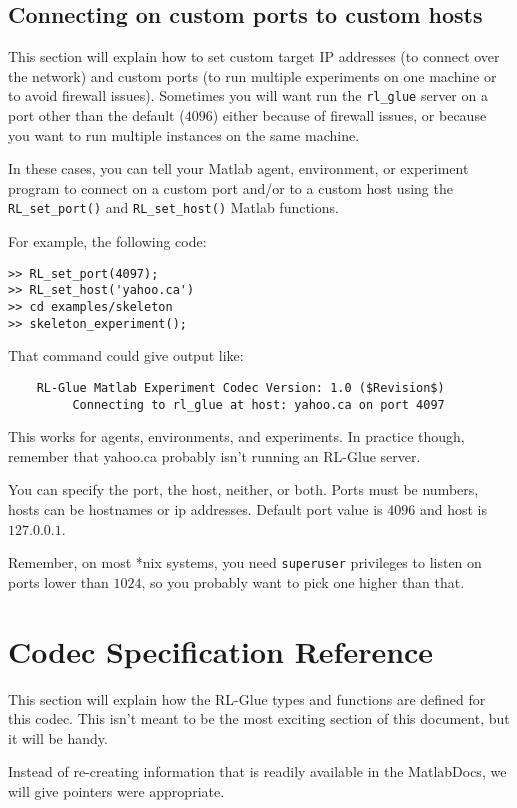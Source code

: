 \documentclass[11pt]{article}
\begin{document}
\subsection{Connecting on custom ports to custom hosts}
This section will explain how to set custom target IP addresses (to connect over the network) and custom ports (to run multiple experiments on one machine or to avoid firewall issues).
Sometimes you will want run the \texttt{rl\_glue} server on a port other than the default
($4096$) either because of firewall issues, or because you want to run multiple instances on the same machine.

In these cases, you can tell your Matlab agent, environment, or experiment program to connect on a custom port and/or to a custom host using the  \texttt{RL\_set\_port()} and \texttt{RL\_set\_host()} Matlab functions.

For example, the following code:
\begin{verbatim}
>> RL_set_port(4097);
>> RL_set_host('yahoo.ca')
>> cd examples/skeleton
>> skeleton_experiment();
\end{verbatim}

That command could give output like:
\begin{verbatim}
	RL-Glue Matlab Experiment Codec Version: 1.0 ($Revision$)
	     Connecting to rl_glue at host: yahoo.ca on port 4097
\end{verbatim}

This works for agents, environments, and experiments.  In practice though, remember that yahoo.ca probably isn't running an RL-Glue server.

You can specify the port, the host, neither, or both.  Ports must be numbers, hosts can be hostnames or ip addresses. Default port value is $4096$ and host is $127.0.0.1$.

Remember, on most *nix systems, you need \texttt{superuser} privileges to listen on ports lower than $1024$, so you probably want to pick one higher than that.

\section{Codec Specification Reference}
This section will explain how the RL-Glue types and functions are defined for this codec.  This isn't meant to be the most exciting section of this document, but it will
be handy.

Instead of re-creating information that is readily available in the MatlabDocs, we will give pointers were appropriate.
\end{document}
